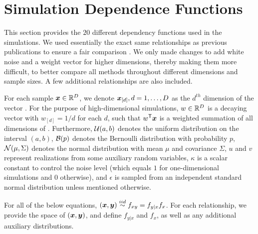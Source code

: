 \documentclass[11pt]{extarticle}
\begin{document}
\clearpage


\section{Simulation Dependence Functions}
\label{appen:function}

This section provides the $20$ different dependency functions used in the simulations.  We used essentially the exact same relationships as previous publications to ensure a fair comparison \cite{SzekelyRizzoBakirov2007, SimonTibshirani2012, SimonTibshirani2012, GorfineHellerHeller2012}.  We only made changes to add white noise and a weight vector for higher dimensions, thereby making them more difficult, to better compare all methods throughout different dimensions and sample sizes. A few additional relationships are also included.

For each sample $\boldsymbol{x} \in \mathbb{R}^{D}$, we denote $\boldsymbol{x}_{[d]}, d=1,\ldots,D$ as the $d^{th}$ dimension of the vector \mbx. For the purpose of high-dimensional simulations, $w \in \mathbb{R}^{D}$ is a decaying vector with $w_{[d]}=1/d$ for each $d$, such that $w^{\mathsf{T}} \boldsymbol{x}$ is a weighted summation of all dimensions of \mbx.
Furthermore, $\mathcal{U}(a,b)$ denotes the uniform distribution on the interval $(a,b)$, $\mathcal{B}(p)$ denotes the Bernoulli distribution with probability $p$, $\mathcal{N}(\mu,{\Sigma})$ denotes the normal distribution with mean ${\mu}$ and covariance ${\Sigma}$,
$u$ and $v$ represent realizations from some auxiliary random variables, $\kappa$ is a scalar constant to control the noise level (which equals $1$ for one-dimensional simulations and $0$ otherwise), and $\epsilon$ is sampled from an independent standard normal distribution unless mentioned otherwise.

For all of the below equations, $(\boldsymbol{x},\boldsymbol{y}) \overset{iid}{\sim} f_{xy} = f_{y|x} f_x$. For each relationship, we provide the space of $(\boldsymbol{x},\boldsymbol{y})$, and define $f_{y|x}$ and $f_x$, as well as any additional auxiliary distributions.
\end{document}
